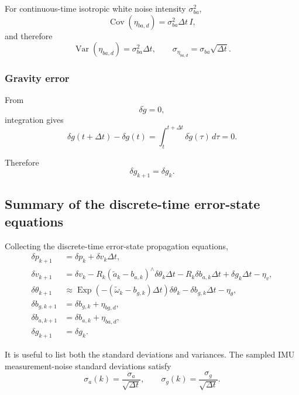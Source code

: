 \documentclass[11pt]{article}
\numberwithin{equation}{section}
\newcommand{\Exp}{\operatorname{Exp}}
\begin{document}
For continuous-time isotropic white noise intensity
$\sigma_{ba}^2$,
\begin{equation}
\boxed{
\operatorname{Cov}(\eta_{ba,d})
=
\sigma_{ba}^2\Delta t\,I,
}
\end{equation}
and therefore
\begin{equation}
\boxed{
\operatorname{Var}(\eta_{ba,d})
=
\sigma_{ba}^2\Delta t,
\qquad
\sigma_{\eta_{ba,d}}
=
\sigma_{ba}\sqrt{\Delta t}.
}
\end{equation}

\subsubsection*{Gravity error}

From
\[
\delta\dot g=0,
\]
integration gives
\[
\delta g(t+\Delta t)-\delta g(t)
=
\int_t^{t+\Delta t}\delta\dot g(\tau)\,d\tau
=
0.
\]

Therefore
\begin{equation}
\boxed{
\delta g_{k+1}
=
\delta g_k.
}
\end{equation}

\subsection{Summary of the discrete-time error-state equations}

Collecting the discrete-time error-state propagation equations,
\begin{equation}
\boxed{
\begin{aligned}
\delta p_{k+1}
&=
\delta p_k+\delta v_k\Delta t,
\\[1mm]
\delta v_{k+1}
&=
\delta v_k
-R_k(\tilde a_k-b_{a,k})^\wedge\delta\theta_k\Delta t
-R_k\delta b_{a,k}\Delta t
+\delta g_k\Delta t
-\eta_v,
\\[1mm]
\delta\theta_{k+1}
&\approx
\Exp\!\left(
-(\tilde\omega_k-b_{g,k})\Delta t
\right)\delta\theta_k
-\delta b_{g,k}\Delta t
-\eta_\theta,
\\[1mm]
\delta b_{g,k+1}
&=
\delta b_{g,k}+\eta_{bg,d},
\\
\delta b_{a,k+1}
&=
\delta b_{a,k}+\eta_{ba,d},
\\
\delta g_{k+1}
&=
\delta g_k.
\end{aligned}
}
\end{equation}

It is useful to list both the standard deviations and variances.  The sampled IMU measurement-noise
standard deviations satisfy
\[
\sigma_a(k)=\frac{\sigma_a}{\sqrt{\Delta t}},
\qquad
\sigma_g(k)=\frac{\sigma_g}{\sqrt{\Delta t}}.
\]
\end{document}
